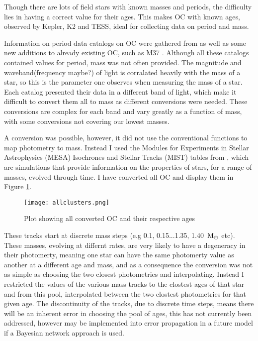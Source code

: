 \documentclass[fleqn,usenatbib]{mnras}
\begin{document}
Though there are lots of field stars with known masses and periods, the difficulty lies in having a correct value for their ages.
This makes OC with known ages, observed by Kepler, K2 and TESS, ideal for collecting data on period and mass.

Information on period data catalogs on OC were gathered from \cite{beuther2014protostars} as well as some new additions to already existing OC, such as M37 \cite{chang}.
Although all these catalogs contained values for period, mass was not often provided.
The magnitude and waveband(frequency maybe?) of light is corralated heavily with the mass of a star, so this is the parameter one observes when measuring the mass of a star. 
Each catalog presented their data in a different band of light, which make it difficult to convert them all to mass as different conversions were needed.
These conversions are complex for each band and vary greatly as a function of mass, with some conversions not covering our lowest masses.

A conversion was possible, however, it did not use the conventional functions to map photometry to mass. 
Instead I used the Modules for Experiments in Stellar Astrophysics (MESA) Isochrones and Stellar Tracks (MIST) tables from \cite{Choi_2016}, which are simulations that provide information on the properties of stars, for a range of masses, evolved through time.
I have converted all OC and display them in Figure \ref{fig:allclusters}.

\begin{figure}
	\centering
	\texttt{[image: allclusters.png]}
	\caption[]{Plot showing all converted OC and their respective ages}
	\label{fig:allclusters}
\end{figure}

These tracks start at discrete mass steps (e.g 0.1, 0.15...1.35, 1.40~$\textup{M}_\odot$ etc).
These masses, evolving at differnt rates, are very likely to have a degeneracy in their photomerty, meaning one star can have the same photomerty value as another at a different age and mass, and as a consequence the conversion was not as simple as choosing the two closest photometries and interpolating.
Instead I restricted the values of the various mass tracks to the clostest ages of that star and from this pool, interpolated between the two clostest photometries for that given age.
The discontinuity of the tracks, due to discrete time steps, means there will be an inherent error in choosing the pool of ages, this has not currently been addressed, however may be implemented into error propagation in a future model if a Bayesian network approach is used. 
\end{document}
